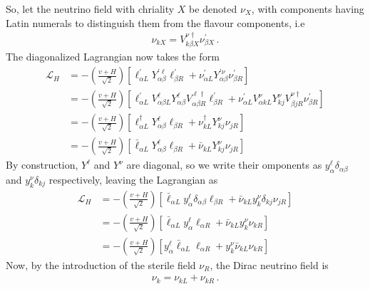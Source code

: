 So, let the neutrino field with chriality $X$ be denoted $\nu_X$, with components having Latin numerals to distinguish them from the flavour components, i.e 
\begin{align}\label{eq:nu_rotation}
    \nu_{k X} =  V_{k\beta X}^{\nu \dagger} \nu_{\beta X}^\prime\,.
\end{align}
The diagonalized Lagrangian now takes the form 
\begin{align}
    \mathcal{L}_{H} &= -\left( \frac{v + H}{\sqrt{2}} \right) \left[\ell_{\alpha L}^{\prime} Y_{\alpha \beta}^{\prime \ell} \ell_{\beta R}^{\prime} + \nu_{\alpha L}^{\prime} Y_{\alpha \beta}^{\prime \nu} \nu_{\beta R}^{\prime}\right] \nonumber \\
    &= -\left( \frac{v + H}{\sqrt{2}} \right) \left[\ell_{\alpha L}^{\prime} V_{\alpha \beta L}^{\ell} Y_{\alpha \beta}^{ \ell} V_{\alpha \beta R}^{\ell \dagger} \ell_{\beta R}^{\prime}
    + \nu_{\alpha L}^{\prime} V_{\alpha k L}^{\nu} Y_{kj}^{\nu} V_{\beta j  R}^{\nu \dagger} \nu_{\beta R}^{\prime}\right] \nonumber \\
    &= -\left( \frac{v + H}{\sqrt{2}} \right) \left[\ell_{\alpha L}^\dagger Y_{\alpha \beta}^{ \ell} \ell_{\beta R} + \nu_{k L}^{\dagger} Y_{kj}^{ \nu} \nu_{j R}\right] \nonumber \\
    &= -\left( \frac{v + H}{\sqrt{2}} \right) \left[\bar{\ell}_{\alpha L} Y_{\alpha \beta}^{ \ell} \ell_{\beta R} + \bar{\nu}_{k L} Y_{kj}^\nu \nu_{j R}\right]
\end{align}
By construction, $Y^\ell$ and $Y^\nu$ are diagonal, so we write their omponents as $y_{\alpha}^{\ell} \delta_{\alpha \beta}$ and $y_{k}^{\nu} \delta_{k j}$ respectively, leaving the Lagrangian as 
\begin{align}\label{eq:L_H}
    \mathcal{L}_{H} 
    &=-\left( \frac{v + H}{\sqrt{2}} \right) \left[\bar{\ell}_{\alpha L} y_{\alpha}^{\ell} \delta_{\alpha \beta} \ell_{\beta R} + \bar{\nu}_{k L} y_{k}^{\nu} \delta_{k j} \nu_{j R}\right] \nonumber \\
    &=-\left( \frac{v + H}{\sqrt{2}} \right) \left[\bar{\ell}_{\alpha L} y_{\alpha}^{\ell}  \ell_{\alpha R} + \bar{\nu}_{k L} y_{k}^{\nu} \nu_{k R}\right] \nonumber \\
    &=-\left( \frac{v + H}{\sqrt{2}} \right) \left[ y_{\alpha}^{\ell}  \bar{\ell}_{\alpha L}\ell_{\alpha R} +  y_{k}^{\nu}\bar{\nu}_{k L} \nu_{k R}\right] 
\end{align}
Now, by the introduction of the sterile field $\nu_R$, the Dirac neutrino field is
\begin{align}
    \nu_k = \nu_{kL} + \nu_{kR}\,.
\end{align}
